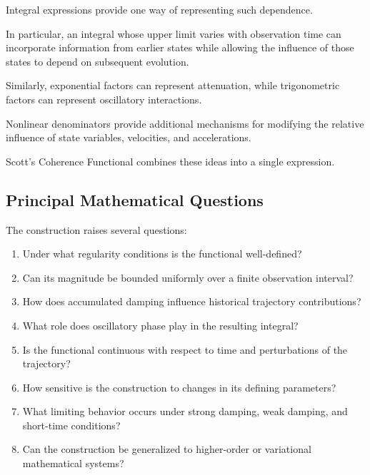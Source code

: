 \documentclass[12pt]{article}
\numberwithin{equation}{section}
\theoremstyle{definition}
\theoremstyle{remark}
\begin{document}
Integral expressions provide one way of
representing such dependence.

In particular, an integral whose upper limit
varies with observation time can incorporate
information from earlier states while allowing
the influence of those states to depend on
subsequent evolution.

Similarly, exponential factors can represent
attenuation, while trigonometric factors can
represent oscillatory interactions.

Nonlinear denominators provide additional
mechanisms for modifying the relative influence
of state variables, velocities, and accelerations.

Scott's Coherence Functional combines these
ideas into a single expression.

\subsection{Principal Mathematical Questions}

The construction raises several questions:

\begin{enumerate}[label=\arabic*.]

\item Under what regularity conditions is the
functional well-defined?

\item Can its magnitude be bounded uniformly
over a finite observation interval?

\item How does accumulated damping influence
historical trajectory contributions?

\item What role does oscillatory phase play
in the resulting integral?

\item Is the functional continuous with respect
to time and perturbations of the trajectory?

\item How sensitive is the construction to
changes in its defining parameters?

\item What limiting behavior occurs under
strong damping, weak damping, and short-time
conditions?

\item Can the construction be generalized to
higher-order or variational mathematical systems?

\end{enumerate}
\end{document}
